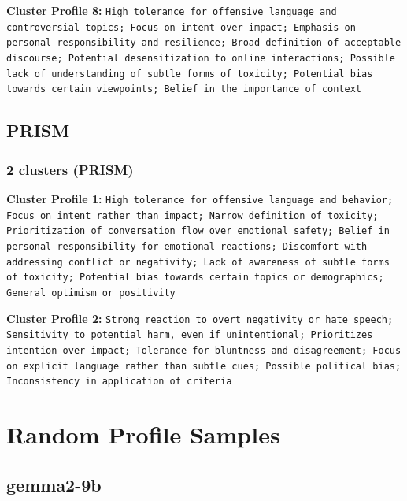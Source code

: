 \documentclass[11pt]{article}
\begin{document}
\textbf{Cluster Profile 8:} \texttt{High tolerance for offensive language and controversial topics; Focus on intent over impact; Emphasis on personal responsibility and resilience; Broad definition of acceptable discourse; Potential desensitization to online interactions; Possible lack of understanding of subtle forms of toxicity; Potential bias towards certain viewpoints; Belief in the importance of context}


\subsection{PRISM}


\subsubsection{2 clusters (PRISM)}


\textbf{Cluster Profile 1:} \texttt{High tolerance for offensive language and behavior; Focus on intent rather than impact; Narrow definition of toxicity; Prioritization of conversation flow over emotional safety; Belief in personal responsibility for emotional reactions; Discomfort with addressing conflict or negativity; Lack of awareness of subtle forms of toxicity; Potential bias towards certain topics or demographics; General optimism or positivity}


\textbf{Cluster Profile 2:} \texttt{Strong reaction to overt negativity or hate speech; Sensitivity to potential harm, even if unintentional; Prioritizes intention over impact; Tolerance for bluntness and disagreement; Focus on explicit language rather than subtle cues; Possible political bias; Inconsistency in application of criteria}

\section{Random Profile Samples}
\label{app:random-profile-samples}
\subsection{gemma2-9b}
\end{document}
